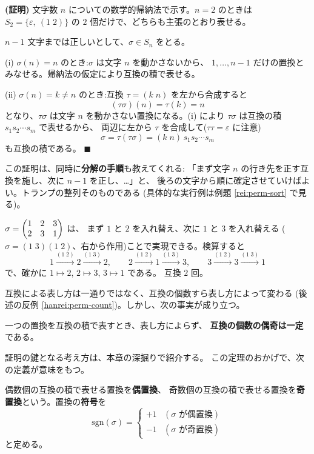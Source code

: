 \noindent\textbf{(証明)}\quad
文字数 $n$ についての数学的帰納法で示す。$n = 2$ のときは
$S_2 = \{\varepsilon,\ (1\;2)\}$ の $2$ 個だけで、どちらも主張のとおり表せる。

$n - 1$ 文字までは正しいとして、$\sigma \in S_n$ をとる。

(i) $\sigma(n) = n$ のとき:$\sigma$ は文字 $n$ を動かさないから、
$1, \dots, n - 1$ だけの置換とみなせる。帰納法の仮定により互換の積で表せる。

(ii) $\sigma(n) = k \neq n$ のとき:互換 $\tau = (k \; n)$ を左から合成すると
\[
(\tau\sigma)(n) = \tau(k) = n
\]
となり、$\tau\sigma$ は文字 $n$ を動かさない置換になる。(i) により
$\tau\sigma$ は互換の積 $s_1 s_2 \cdots s_m$ で表せるから、
両辺に左から $\tau$ を合成して($\tau\tau = \varepsilon$ に注意)
\[
\sigma = \tau(\tau\sigma) = (k\;n)\, s_1 s_2 \cdots s_m
\]
も互換の積である。 $\blacksquare$

この証明は、同時に\textbf{分解の手順}も教えてくれる:
「まず文字 $n$ の行き先を正す互換を施し、次に $n - 1$ を正し、…」と、
後ろの文字から順に確定させていけばよい。トランプの整列そのものである
(具体的な実行例は例題 \ref{rei:perm-sort} で見る)。

\begin{rei}[互換への分解]\label{rei:perm-decomp-ex}
$\sigma = \begin{pmatrix}1 & 2 & 3 \\ 2 & 3 & 1\end{pmatrix}$ は、
まず $1$ と $2$ を入れ替え、次に $1$ と $3$ を入れ替える
($\sigma = (1\;3)(1\;2)$、右から作用)ことで実現できる。検算すると
\[
1 \xrightarrow{(1\;2)} 2 \xrightarrow{(1\;3)} 2, \qquad
2 \xrightarrow{(1\;2)} 1 \xrightarrow{(1\;3)} 3, \qquad
3 \xrightarrow{(1\;2)} 3 \xrightarrow{(1\;3)} 1
\]
で、確かに $1 \mapsto 2$, $2 \mapsto 3$, $3 \mapsto 1$ である。
互換 $2$ 回。
\end{rei}

互換による表し方は一通りではなく、互換の個数すら表し方によって変わる
(後述の反例 \ref{hanrei:perm-count})。しかし、次の事実が成り立つ。

\begin{teiri}[偶奇の不変性]\label{thm:perm-parity}
一つの置換を互換の積で表すとき、表し方によらず、
\textbf{互換の個数の偶奇は一定}である。
\end{teiri}

証明の鍵となる考え方は、本章の深掘りで紹介する。
この定理のおかげで、次の定義が意味をもつ。

\begin{teigi}\label{def:sgn}
偶数個の互換の積で表せる置換を\textbf{偶置換}、
奇数個の互換の積で表せる置換を\textbf{奇置換}という。置換の\textbf{符号}を
\[
\mathrm{sgn}(\sigma) =
\begin{cases}
+1 & (\sigma \text{ が偶置換}) \\
-1 & (\sigma \text{ が奇置換})
\end{cases}
\]
と定める。
\end{teigi}

